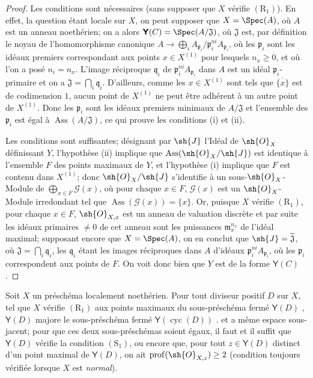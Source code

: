 \begin{proof}
Les conditions sont nécessaires (sans supposer que $X$ vérifie $(\mathrm{R}_1)$).
En effet, la question étant locale sur $X$, on peut supposer que $X=\Spec(A)$, où $A$ est un anneau noethérien;
on a alors $\boldsymbol{\mathsf{Y}}(C)=\Spec(A/\mathfrak{J})$, où $\mathfrak{J}$ est, par définition  le noyau de l'homomorphisme canonique $A\to\bigoplus_i A_{\mathfrak{p}_i}/\mathfrak{p}_i^{ni}A_{\mathfrak{p}_i}$, où les $\mathfrak{p}_i$ sont les idéaux premiers correspondant aux points $x\in X^{(1)}$ pour lesquels $n_x\geq0$, et où l'on a posé $n_i=n_x$.
L'image réciproque $\mathfrak{q}_i$ de $\mathfrak{p}_i^{ni}A_{\mathfrak{p}_i}$ dans $A$ est un idéal $\mathfrak{p}_i$-primaire et on a $\mathfrak{J}=\bigcap_i\mathfrak{q}_i$.
D'ailleurs, comme les $x\in X^{(1)}$ sont tels que $\overline{\{x\}}$ est de codimension $1$, aucun point de $X^{(1)}$ ne peut être adhérent à un autre point de $X^{(1)}$.
Donc les $\mathfrak{p}_i$ sont les idéaux premiers minimaux de $A/\mathfrak{J}$ et l'ensemble des $\mathfrak{p}_i$ est égal à $\operatorname{Ass}(A/\mathfrak{J})$, ce qui prouve les conditions (i) et (ii).

Les conditions sont suffisantes;
désignant par $\sh{J}$ l'Idéal de $\sh{O}_X$ définissant $Y$, l'hypothèse (ii) implique que $\operatorname{Ass}(\sh{O}_X/\sh{J})$ est identique à l'ensemble $F$ des points maximaux de $Y$, et l'hypothèse (i) implique que $F$ est contenu dans $X^{(1)}$;
donc  $\sh{O}_X/\sh{J}$ s'identifie à un sous-$\sh{O}_X$-Module de $\bigoplus_{x\in F}\mathscr{G}(x)$, où pour chaque $x\in F$, $\mathscr{G}(x)$ est un $\sh{O}_X$-Module irredondant tel que $\operatorname{Ass}(\mathscr{G}(x))=\{x\}$.
Or, puisque $X$ vérifie $(\mathrm{R}_1)$, pour chaque $x\in F$, $\sh{O}_{X,x}$ est un anneau de valuation discrète et par suite les idéaux primaires $\neq0$ de cet anneau sont les puissances $\mathfrak{m}_x^{n_x}$ de l'idéal maximal;
supposant encore que $X=\Spec(A)$, on en conclut que $\sh{J}=\widetilde{\mathfrak{J}}$, où $\mathfrak{J}=\bigcap_i\mathfrak{q}_i$, les $\mathfrak{q}_i$ étant les images réciproques dans $A$ d'idéaux $\mathfrak{p}_i^{ni}A_{\mathfrak{p}_i}$, où les $\mathfrak{p}_i$ correspondent aux points de $F$.
On voit donc bien que $Y$ est de la forme $\boldsymbol{\mathsf{Y}}(C)$.
\end{proof}

\begin{corollary}[21.7.3]
\label{IV.21.7.3}
Soit $X$ un préschéma localement noethérien.
Pour tout diviseur positif $D$ sur $X$, tel que $X$ vérifie $(\mathrm{R}_1)$ aux points maximaux du sous-préschéma fermé $\boldsymbol{\mathsf{Y}}(D)$ , $\boldsymbol{\mathsf{Y}}(D)$ majore le sous-préschéma fermé $\boldsymbol{\mathsf{Y}}(\operatorname{cyc}(D))$ . et a même espace sous-jacent;
pour que ces deux sous-préschémas soient égaux, il faut et il suffit que $\boldsymbol{\mathsf{Y}}(D)$ vérifie la condition $(\mathrm{S}_1)$, ou encore que, pour tout $z\in\boldsymbol{\mathsf{Y}}(D)$ distinct d'un point maximal de $\boldsymbol{\mathsf{Y}}(D)$, on ait $\operatorname{prof}(\sh{O}_{X,z})\geq2$ \textup{(condition toujours vérifiée lorsque $X$ est \emph{normal})}.
\end{corollary}

